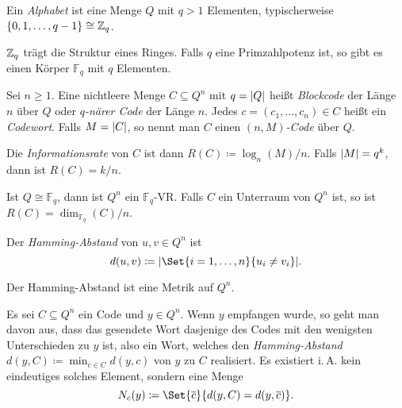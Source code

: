 \documentclass{cheat-sheet}
\newcommand{\F}{\mathbb{F}} %
\begin{document}



\begin{defn}
  Ein \emph{Alphabet} ist eine Menge $Q$ mit $q > 1$ Elementen, typischerweise $\{ 0, 1, \ldots, q-1 \} \cong \mathbb{Z}_q$.
\end{defn}

\begin{bem}
  $\mathbb{Z}_q$ trägt die Struktur eines Ringes.
  Falls $q$ eine Primzahlpotenz ist, so gibt es einen Körper $\F_q$ mit $q$ Elementen.
\end{bem}

\begin{defn}
  Sei $n \geq 1$. Eine nichtleere Menge $C \subseteq Q^n$ mit $q = \lvert Q\rvert$ heißt \emph{Blockcode} der Länge $n$ über $Q$ oder \emph{$q$-närer Code} der Länge $n$. Jedes $c = (c_1, \ldots, c_n) \in C$ heißt ein \emph{Codewort}.
  Falls $M = \lvert C\rvert$, so nennt man $C$ einen \emph{$(n, M)$-Code} über $Q$.
\end{defn}

\begin{defn}
  Die \emph{Informationsrate} von $C$ ist dann $R(C) \coloneqq \log_n(M) / n$.
  Falls $\lvert M\rvert = q^k$, dann ist $R(C) = k/n$.
\end{defn}

\begin{bem}
  Ist $Q \cong \F_q$, dann ist $Q^n$ ein $\F_q$-VR. Falls $C$ ein Unterraum von $Q^n$ ist, so ist $R(C) = \dim_{\F_q}(C) / n$.
\end{bem}

\begin{defn}
  Der \emph{Hamming-Abstand} von $u, v \in Q^n$ ist
  \[ d(u, v) \coloneqq \abs{\Set{i=1,\ldots,n}{u_i \neq v_i}}. \]
\end{defn}

\begin{lem}
  Der Hamming-Abstand ist eine Metrik auf $Q^n$.
\end{lem}

\begin{nota}
  Es sei $C \subseteq Q^n$ ein Code und $y \in Q^n$.
  Wenn $y$ empfangen wurde, so geht man davon aus, dass das gesendete Wort dasjenige des Codes mit den wenigsten Unterschieden zu $y$ ist, also ein Wort, welches den \emph{Hamming-Abstand} $d(y, C) \coloneqq \min_{c \in C} d(y, c)$ von $y$ zu $C$ realisiert.
  Es existiert i.\,A. kein eindeutiges solches Element, sondern eine Menge
  \[ N_c(y) \coloneqq \Set{\overline{c}}{d(y, C) = d(y, \overline{c})}. \]
\end{nota}
\end{document}
